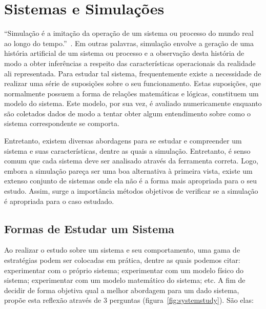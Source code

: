\chapter{\label{chap:simulation}Sistemas e Simulações}

``Simulação é a imitação da operação de um sistema ou processo do mundo real ao
longo do tempo.''~\cite{Banks}. Em outras palavras, simulação envolve a geração
de uma história artificial de um sistema ou processo e a observação desta
história de modo a obter inferências a respeito das características operacionais
da realidade ali representada. Para estudar tal sistema, frequentemente existe a
necessidade de realizar uma série de suposições sobre o seu funcionamento. Estas
suposições, que normalmente possuem a forma de relações matemáticas e lógicas,
constituem um modelo do sistema. Este modelo, por sua vez, é avaliado
numericamente enquanto são coletados dados de modo a tentar obter algum
entendimento sobre como o sistema correspondente se comporta.

Entretanto, existem diversas abordagens para se estudar e compreender um sistema
e suas características, dentre as quais a simulação. Entretanto, é senso comum
que cada sistema deve ser analisado através da ferramenta correta. Logo, embora
a simulação pareça ser uma boa alternativa à primeira vista, existe um extenso
conjunto de sistemas onde ela não é a forma mais apropriada para o seu estudo.
Assim, surge a importância métodos objetivos de verificar se a simulação é
apropriada para o caso estudado.

\section{\label{chap:waystostudy}Formas de Estudar um Sistema}

Ao realizar o estudo sobre um sistema e seu comportamento, uma gama de
estratégias podem ser colocadas em prática, dentre as quais podemos citar:
experimentar com o próprio sistema; experimentar com um modelo físico do
sistema; experimentar com um modelo matemático do sistema; etc. A fim de decidir
de forma objetiva qual a melhor abordagem para um dado sistema,~\cite{Law}
propõe esta reflexão através de 3 perguntas (figura~\ref{fig:systemstudy}). São
elas:

